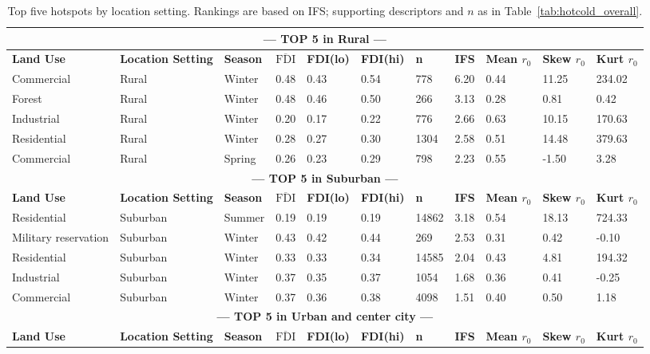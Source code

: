 \documentclass[a4paper,fleqn]{cas-sc}
\begin{document}
\begin{table}[htb]
\centering
\scriptsize
\caption{Top five hotspots by location setting. Rankings are based on IFS; supporting descriptors and $n$ as in Table~\ref{tab:hotcold_overall}.}
\label{tab:hotcold_by_loc}
\begin{tabular}{lllllllllll}
\hline
\multicolumn{11}{c}{\textbf{— TOP 5 in Rural —}} \\
\hline
\textbf{Land Use} & \textbf{Location Setting} & \textbf{Season} & \textbf{$\overline{\mathrm{FDI}}$} & \textbf{FDI(lo)} & \textbf{FDI(hi)} & \textbf{n} & \textbf{IFS} & \textbf{Mean $r_0$} & \textbf{Skew $r_0$} & \textbf{Kurt $r_0$} \\
\hline
Commercial & Rural & Winter & 0.48 & 0.43 & 0.54 & 778 & 6.20 & 0.44 & 11.25 & 234.02 \\
Forest & Rural & Winter & 0.48 & 0.46 & 0.50 & 266 & 3.13 & 0.28 & 0.81 & 0.42 \\
Industrial & Rural & Winter & 0.20 & 0.17 & 0.22 & 776 & 2.66 & 0.63 & 10.15 & 170.63 \\
Residential & Rural & Winter & 0.28 & 0.27 & 0.30 & 1304 & 2.58 & 0.51 & 14.48 & 379.63 \\
Commercial & Rural & Spring & 0.26 & 0.23 & 0.29 & 798 & 2.23 & 0.55 & -1.50 & 3.28 \\
\hline
\multicolumn{11}{c}{\textbf{— TOP 5 in Suburban —}} \\
\hline
\textbf{Land Use} & \textbf{Location Setting} & \textbf{Season} & \textbf{$\overline{\mathrm{FDI}}$} & \textbf{FDI(lo)} & \textbf{FDI(hi)} & \textbf{n} & \textbf{IFS} & \textbf{Mean $r_0$} & \textbf{Skew $r_0$} & \textbf{Kurt $r_0$} \\
\hline
Residential & Suburban & Summer & 0.19 & 0.19 & 0.19 & 14862 & 3.18 & 0.54 & 18.13 & 724.33 \\
Military reservation & Suburban & Winter & 0.43 & 0.42 & 0.44 & 269 & 2.53 & 0.31 & 0.42 & -0.10 \\
Residential & Suburban & Winter & 0.33 & 0.33 & 0.34 & 14585 & 2.04 & 0.43 & 4.81 & 194.32 \\
Industrial & Suburban & Winter & 0.37 & 0.35 & 0.37 & 1054 & 1.68 & 0.36 & 0.41 & -0.25 \\
Commercial & Suburban & Winter & 0.37 & 0.36 & 0.38 & 4098 & 1.51 & 0.40 & 0.50 & 1.18 \\
\hline
\multicolumn{11}{c}{\textbf{— TOP 5 in Urban and center city —}} \\
\hline
\textbf{Land Use} & \textbf{Location Setting} & \textbf{Season} & \textbf{$\overline{\mathrm{FDI}}$} & \textbf{FDI(lo)} & \textbf{FDI(hi)} & \textbf{n} & \textbf{IFS} & \textbf{Mean $r_0$} & \textbf{Skew $r_0$} & \textbf{Kurt $r_0$} \\

\end{tabular}
\end{table}
\end{document}
